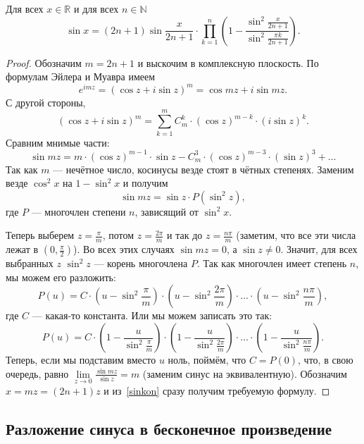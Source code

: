 \begin{lemma} \hypertarget{sinlem}{}
	Для всех \(x \in \mathbb{R}\) и для всех \(n \in \mathbb{N}\) \[
	\sin x = (2n + 1) \sin \frac{x}{2n + 1} \cdot \prod_{k=1}^{n} \left(1 - \frac{\sin^2 \frac{x}{2n + 1}}{\sin^2 \frac{\pi k}{2n + 1}} \right).
	\]
\end{lemma}
\begin{proof}
	Обозначим \(m = 2n + 1\) и выскочим в комплексную плоскость. По формулам Эйлера и Муавра имеем \[
	e^{i m z} = (\cos z + i \sin z)^m = \cos mz + i \sin mz.
	\]
	С другой стороны, \[
	(\cos z + i \sin z)^m = \sum_{k=1}^{m} C_m^k \cdot (\cos z)^{m-k} \cdot (i \sin z)^k.
	\]
	Сравним мнимые части: \[
	\sin mz = m \cdot (\cos z)^{m-1} \cdot \sin z - C_m^3 \cdot (\cos z)^{m-3} \cdot (\sin z)^3 + \ldots
	\]
	Так как \(m\) --- нечётное число, косинусы везде стоят в чётных степенях. Заменим везде \(\cos^2 x\) на \(1 - \sin^2 x\) и получим
	\begin{equation} \label{sinkon}
		\sin mz = \sin z \cdot P(\sin^2 z),
	\end{equation}
	где \(P\) --- многочлен степени \(n\), зависящий от \(\sin^2 x\).
	
	Теперь выберем \(z = \frac{\pi}{m}\), потом \(z = \frac{2 \pi}{m}\) и так до \(z = \frac{n \pi}{m}\) \big(заметим, что все эти числа лежат в \(\left(0, \frac{\pi}{2} \right)\)\big). Во всех этих случаях \(\sin mz = 0\), а \(\sin z \neq 0\). Значит, для всех выбранных \(z\) \(\sin^2 z\) --- корень многочлена \(P\). Так как многочлен имеет степень \(n\), мы можем его разложить: \[
	P(u) = C \cdot \left(u - \sin^2 \frac{\pi}{m} \right) \cdot \left(u - \sin^2 \frac{2 \pi}{m} \right) \cdot \ldots \cdot \left(u - \sin^2 \frac{n \pi}{m} \right),
	\]
	где \(C\) --- какая-то константа. Или мы можем записать это так: \[
	P(u) = C \cdot \left(1 - \frac{u}{\sin^2 \frac{\pi}{m}} \right) \cdot \left(1 - \frac{u}{\sin^2 \frac{2 \pi}{m}} \right) \cdot \ldots \cdot \left(1 - \frac{u}{\sin^2 \frac{n \pi}{m}} \right).
	\]
	Теперь, если мы подставим вместо \(u\) ноль, поймём, что \(C = P(0)\), что, в свою очередь, равно \(\lim\limits_{z \to 0} \frac{\sin mz}{\sin z} = m\) (заменим синус на эквивалентную). Обозначим \(x = mz = (2n + 1) z\) и из~\eqref{sinkon} сразу получим требуемую формулу.
\end{proof}

\subsection{Разложение синуса в бесконечное произведение}

